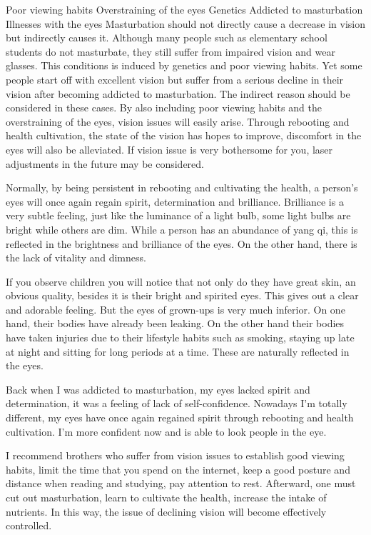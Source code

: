 \documentclass[
]{book}
\begin{document}
Poor viewing habits
Overstraining of the eyes
Genetics
Addicted to masturbation
Illnesses with the eyes
Masturbation should not directly cause a decrease in vision but indirectly causes it. Although many people such as elementary school students do not masturbate, they still suffer from impaired vision and wear glasses. This conditions is induced by genetics and poor viewing habits. Yet some people start off with excellent vision but suffer from a serious decline in their vision after becoming addicted to masturbation. The indirect reason should be considered in these cases. By also including poor viewing habits and the overstraining of the eyes, vision issues will easily arise. Through rebooting and health cultivation, the state of the vision has hopes to improve, discomfort in the eyes will also be alleviated. If vision issue is very bothersome for you, laser adjustments in the future may be considered.

Normally, by being persistent in rebooting and cultivating the health, a person's eyes will once again regain spirit, determination and brilliance. Brilliance is a very subtle feeling, just like the luminance of a light bulb, some light bulbs are bright while others are dim. While a person has an abundance of yang qi, this is reflected in the brightness and brilliance of the eyes. On the other hand, there is the lack of vitality and dimness.

If you observe children you will notice that not only do they have great skin, an obvious quality, besides it is their bright and spirited eyes. This gives out a clear and adorable feeling. But the eyes of grown-ups is very much inferior. On one hand, their bodies have already been leaking. On the other hand their bodies have taken injuries due to their lifestyle habits such as smoking, staying up late at night and sitting for long periods at a time. These are naturally reflected in the eyes.

Back when I was addicted to masturbation, my eyes lacked spirit and determination, it was a feeling of lack of self-confidence. Nowadays I'm totally different, my eyes have once again regained spirit through rebooting and health cultivation. I'm more confident now and is able to look people in the eye.

I recommend brothers who suffer from vision issues to establish good viewing habits, limit the time that you spend on the internet, keep a good posture and distance when reading and studying, pay attention to rest. Afterward, one must cut out masturbation, learn to cultivate the health, increase the intake of nutrients. In this way, the issue of declining vision will become effectively controlled.
\end{document}
